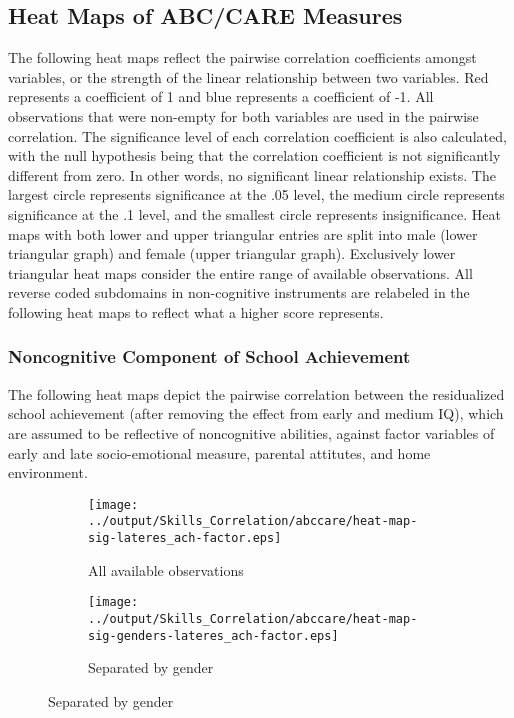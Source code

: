 \subsection{Heat Maps of ABC/CARE Measures}

The following heat maps reflect the pairwise correlation coefficients amongst variables, or the strength of the linear relationship between two variables. Red represents a coefficient of 1 and blue represents a coefficient of -1. All observations that were non-empty for both variables are used in the pairwise correlation. The significance level of each correlation coefficient is also calculated, with the null hypothesis being that the correlation coefficient is not significantly different from zero. In other words, no significant linear relationship exists. The largest circle represents significance at the .05 level, the medium circle represents significance at the .1 level, and the smallest circle represents insignificance. Heat maps with both lower and upper triangular entries are split into male (lower triangular graph) and female (upper triangular graph). Exclusively lower triangular heat maps consider the entire range of available observations. All reverse coded subdomains in non-cognitive instruments are relabeled in the following heat maps to reflect what a higher score represents. 

\subsubsection{Noncognitive Component of School Achievement}

  The following heat maps depict the pairwise correlation between the residualized school achievement (after removing the effect from early and medium IQ), which are assumed to be reflective of noncognitive abilities, against factor variables of early and late socio-emotional measure, parental attitutes, and home environment.

    \begin{figure}[H]
      \centering
      \caption{Heat map with $p$-values of late non-cognitive achievement component against early and late factor variables}
      \label{fig:lateres_ach-factor}
      \begin{subfigure}{0.8\textwidth}
        \centering
        \caption{All available observations}          
        \texttt{[image: ../output/Skills\_Correlation/abccare/heat-map-sig-lateres\_ach-factor.eps]}
        \label{fig:lateres_ach-factor-nogender}
      \end{subfigure}

      \begin{subfigure}{0.8\textwidth}
        \centering
        \caption{Separated by gender}
        \texttt{[image: ../output/Skills\_Correlation/abccare/heat-map-sig-genders-lateres\_ach-factor.eps]}
        \label{fig:lateres_ach-factor-gender}
      \end{subfigure}
    \end{figure}

